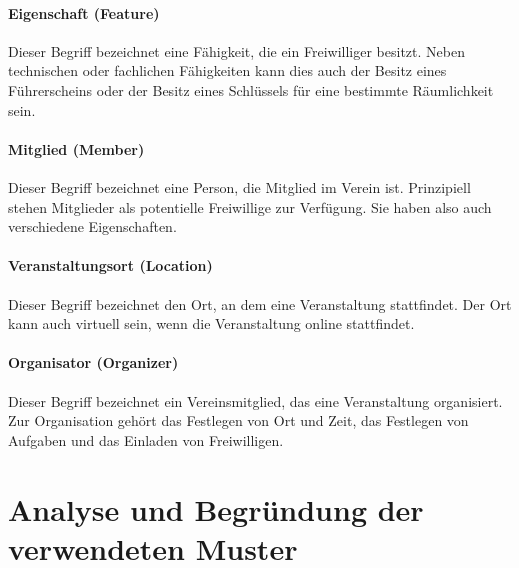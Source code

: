 \paragraph{\glqq Eigenschaft\grqq{} (Feature)}
Dieser Begriff bezeichnet eine Fähigkeit, die ein Freiwilliger besitzt. Neben technischen oder fachlichen Fähigkeiten kann dies auch der Besitz eines Führerscheins oder der Besitz eines Schlüssels für eine bestimmte Räumlichkeit sein.

\paragraph{\glqq Mitglied\grqq{} (Member)}
Dieser Begriff bezeichnet eine Person, die Mitglied im Verein ist. Prinzipiell stehen Mitglieder als potentielle Freiwillige zur Verfügung. Sie haben also auch verschiedene Eigenschaften.

\paragraph{\glqq Veranstaltungsort\grqq{} (Location)}
Dieser Begriff bezeichnet den Ort, an dem eine Veranstaltung stattfindet. Der Ort kann auch \glqq virtuell\grqq{} sein, wenn die Veranstaltung online stattfindet.

\paragraph{\glqq Organisator\grqq{} (Organizer)}
Dieser Begriff bezeichnet ein Vereinsmitglied, das eine Veranstaltung organisiert. Zur Organisation gehört das Festlegen von Ort und Zeit, das Festlegen von Aufgaben und das Einladen von Freiwilligen.

\section{Analyse und Begründung der verwendeten Muster}
\label{section:analyse_und_begrundung_der_verwendeten_muster}